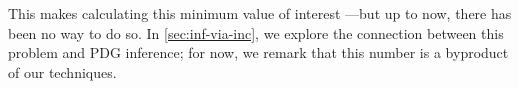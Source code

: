 This makes calculating this minimum value of interest%
---but up to now, there has been no way to do so.
In \cref{sec:inf-via-inc}, we explore the
connection between this problem and PDG inference; 
for now, we remark that this number is a byproduct of our techniques.
    


